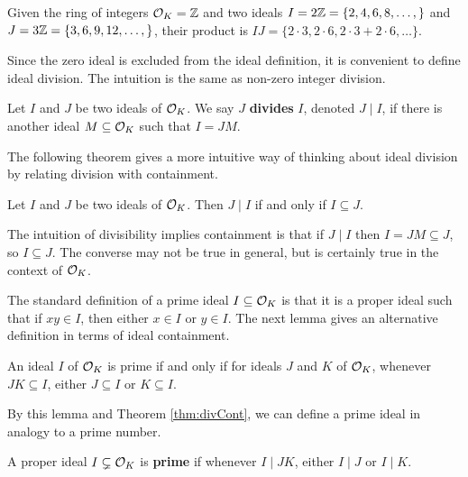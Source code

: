 \documentclass[../main.tex]{subfiles}
\begin{document}
\begin{example}
Given the ring of integers $\mathcal{O}_K = \mathbb{Z}$ and two ideals $I = 2\mathbb{Z} = \{2, 4,6,8,\dots,\}$ and $J = 3\mathbb{Z}=\{3,6,9,12,\dots,\}$, their product is $IJ=\{2\cdot 3, 2\cdot 6,2\cdot 3 + 2\cdot 6,\dots\}$.  
\end{example}
	 
Since the zero ideal is excluded from the ideal definition, it is convenient to define ideal division. The intuition is the same as non-zero integer division. 

\begin{definition}
Let $I$ and $J$ be two ideals of $\mathcal{O}_K$. We say 
\reversemarginpar
{}
$J$ \textbf{divides} $I$, denoted $J \mid I$, if there is another ideal $M \subseteq \mathcal{O}_K$ such that $I = JM$.
\end{definition}

The following theorem gives a more intuitive way of thinking about ideal division by relating division with containment. 

\begin{theorem}
\label{thm:divCont}
Let $I$ and $J$ be two ideals of $\mathcal{O}_K$. Then $J \mid I$ if and only if $I \subseteq J$. 
\end{theorem}
The intuition of divisibility implies containment is that if $J\mid I$ then $I=JM\subseteq J$, so $I\subseteq J$. The converse may not be true in general, but is certainly true in the context of $\mathcal{O}_K$. %

The standard definition of a prime ideal $I \subseteq \mathcal{O}_K$ is that it is a proper ideal such that if $xy \in I$, then either $x \in I$ or $y \in I$. The next lemma gives an alternative definition in terms of ideal containment. 
\begin{lemma}
An ideal $I$ of $\mathcal{O}_K$ is prime if and only if for ideals $J$ and $K$ of $\mathcal{O}_K$, whenever $JK \subseteq I$, either $J \subseteq I$ or $K \subseteq I$. 
\end{lemma}

By this lemma and Theorem \ref{thm:divCont}, we can define a prime ideal in analogy to a prime number. 

\begin{definition}
A proper ideal $I \subsetneq \mathcal{O}_K$ is \textbf{prime} 
\reversemarginpar
{}
if whenever $I \mid JK$, either $I \mid J$ or $I \mid K$.
\end{definition}
\end{document}
